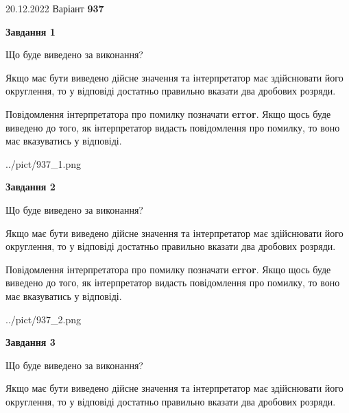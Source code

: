 \documentclass[12pt, ukrainian]{article}
\begin{document}
{20.12.2022 Варіант \No \textbf { 937 }\par}
{
\begin {Large}

{\begin {center}\textbf{Завдання 1}\end {center}}\par
Що буде виведено за виконання? \par

Якщо має бути виведено дійсне значення та інтерпретатор має здійснювати його округлення, 
то у відповіді достатньо правильно вказати два дробових розряди.

Повідомлення інтерпретатора про помилку позначати \textbf{error}.
Якщо щось буде виведено до того, як інтерпретатор видасть повідомлення про помилку, 
то воно має вказуватись у відповіді. \par

\begin{center}
	{../pict/937_1.png}
\end{center}
\newpage

{\begin {center}\textbf{Завдання 2}\end {center}}\par
Що буде виведено за виконання? \par

Якщо має бути виведено дійсне значення та інтерпретатор має здійснювати його округлення, 
то у відповіді достатньо правильно вказати два дробових розряди.

Повідомлення інтерпретатора про помилку позначати \textbf{error}.
Якщо щось буде виведено до того, як інтерпретатор видасть повідомлення про помилку, 
то воно має вказуватись у відповіді. \par

\begin{center}
	{../pict/937_2.png}
\end{center}
\newpage

{\begin {center}\textbf{Завдання 3}\end {center}}\par
Що буде виведено за виконання? \par

Якщо має бути виведено дійсне значення та інтерпретатор має здійснювати його округлення, 
то у відповіді достатньо правильно вказати два дробових розряди.


\end{Large}}
\end{document}
